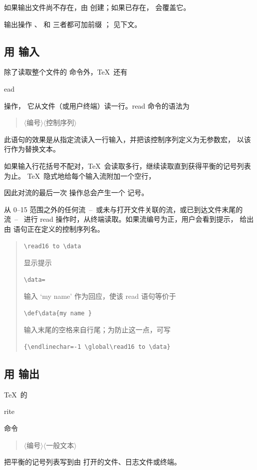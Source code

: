 \documentclass[a4paper]{rapport3}
\makeatletter
\def\gr#1{$\langle$#1$\rangle$}\def\key#1{{\tt#1}}
\def\alt{}\def\altt{}%
\def\ldash{\unskip\ --\nobreak\ \ignorespaces}
\def\rdash{\unskip\nobreak\ --\ \ignorespaces}
\newenvironment{disp}{\begin{quotation}}{\end{quotation}}
\newenvironment{example}{\begin{quotation}}{\end{quotation}}
\def\cstoidx#1\par{\index{#1@\cs{#1}}}
\def\csidx#1{\cstoidx #1\par\cs{#1}}
\makeatother
\begin{document}
如果输出文件尚不存在，由  创建；如果已存在， 会覆盖它。

输出操作 、 和  三者都可加前缀 ；
见下文。

\subsection{用  输入}

除了读取整个文件的  命令外，\TeX\ 还有 \csidx{read} 操作，
它从文件（或用户终端）读一行。read 命令的语法为
  \begin{disp}\gr{编号}\gr{控制序列}\end{disp}
此语句的效果是从指定流读入一行输入，并把该控制序列定义为无参数宏，
以该行作为替换文本。

如果输入行花括号不配对，\TeX\ 会读取多行，继续读取直到获得平衡的记号列表为止。
\TeX\ 隐式地给每个输入流附加一个空行，
\alt
因此对流的最后一次  操作总会产生一个  记号。

从 0--15 范围之外的任何流\ldash 或未与打开文件关联的流，或已到达文件末尾的流\rdash
进行 read 操作时，从终端读取。如果流编号为正，用户会看到提示，
给出由  语句正在定义的控制序列名。

\begin{example}\begin{verbatim}
\read16 to \data
\end{verbatim}
显示提示 \begin{verbatim}
\data=
\end{verbatim}
输入 `my name' 作为回应，使该 read 语句等价于
\begin{verbatim}
\def\data{my name }
\end{verbatim}
输入末尾的空格来自行尾；为防止这一点，可写
\begin{verbatim}
{\endlinechar=-1 \global\read16 to \data}
\end{verbatim}
\end{example}

\subsection{用  输出}

\TeX\ 的 \csidx{write} 命令
  \begin{disp}\gr{编号}\gr{一般文本}\end{disp}
把平衡的记号列表写到由  打开的文件、日志文件或终端。
\end{document}
